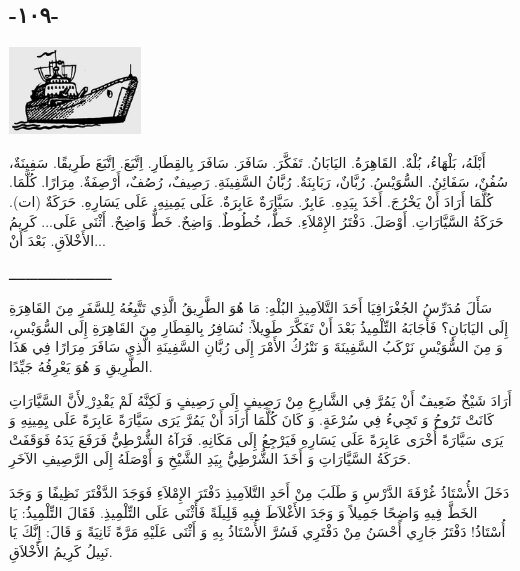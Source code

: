 \documentclass[a5paper]{article}
\begin{document}
\subsection[-١٠٩-]{-١٠٩-}
\begin{center}
\includegraphics[width=1.3752in,height=0.9055in]{images/MuhammadBagauddinprettified-img282.png}
\end{center}
أَبْلَهُ، بَلْهَاءُ، بُلْهٌ. القَاهِرَةُ. اليَابَانُ. تَفَكَّرَ. سَافَرَ. سَافَرَ بِالقِطَارِ. اِتَّبَعَ. اِتَّبَعَ طَرِيقًا. سَفِينَةٌ، سُفُنٌ، سَفَائِنُ. السُّوَيْسُ. رُبَّانٌ، رَبَابِنَةٌ. رُبَّانُ السَّفِينَةِ. رَصِيفٌ، رُصُفٌ، أَرْصِفَةٌ. مِرَارًا. كُلَّمَا. كُلَّمَا أَرَادَ أَنْ يَخْرُجَ. أَخَذَ بِيَدِهِ. عَابِرٌ. سَيَّارَةٌ عَابِرَةٌ. عَلَى يَمِينِهِ. عَلَى يَسَارِهِ. حَرَكَةٌ (ات). حَرَكَةُ السَّيَّارَاتِ. أَوْصَلَ. دَفْتَرُ الإِمْلاَءِ. خَطٌّ، خُطُوطٌ. وَاضِحٌ. خَطٌّ وَاضِحٌ. أَثْنَى عَلَى... كَرِيمُ الأَخْلاَقِ. بَعْدَ أَنْ...

ـــــــــــــــــــــــــ

سَأَلَ مُدَرِّسُ الجُغْرَافِيَا أَحَدَ التَّلاَمِيذِ البُلْهِ: مَا هُوَ الطَّرِيقُ الَّذِي تَتَّبِعُهُ لِلسَّفَرِ مِنَ القَاهِرَةِ إِلَى اليَابَانِ؟ فَأَجَابَهُ التِّلْمِيذُ بَعْدَ أَنْ تَفَكَّرَ طَوِيلاً: نُسَافِرُ بِالقِطَارِ مِنَ القَاهِرَةِ إِلَى السُّوَيْسِ، وَ مِنَ السُّوَيْسِ نَرْكَبُ السَّفِينَةَ وَ نَتْرُكُ الأَمْرَ إِلَى رُبَّانِ السَّفِينَةِ الَّذِي سَافَرَ مِرَارًا فِي هَذَا الطَّرِيقِ وَ هُوَ يَعْرِفُهُ جَيِّدًا.

أَرَادَ شَيْخٌ ضَعِيفٌ أَنْ يَمُرَّ فِي الشَّارِعِ مِنْ رَصِيفٍ إِلَى رَصِيفٍ وَ لَكِنَّهُ لَمْ يَقْدِرْ ِلأَنَّ السَّيَّارَاتِ كَانَتْ تَرُوحُ وَ تَجِيءُ فِي سُرْعَةٍ. وَ كَانَ كُلَّمَا أَرَادَ أَنْ يَمُرَّ يَرَى سَيَّارَةً عَابِرَةً عَلَى يِمِينِهِ وَ يَرَى سَيَّارَةً أُخْرَى عَابِرَةً عَلَى يَسَارِهِ فَيَرْجِعُ إِلَى مَكَانِهِ. فَرَآهُ الشُّرْطِيُّ فَرَفَعَ يَدَهُ فَوَقَفَتْ حَرَكَةُ السَّيَّارَاتِ وَ أَخَذَ الشُّرْطِيُّ بِيَدِ الشَّيْخِ وَ أَوْصَلَهُ إِلَى الرَّصِيفِ الآخَرِ.

دَخَلَ الأُسْتَاذُ غُرْفَةَ الدَّرْسِ وَ طَلَبَ مِنْ أَحَدِ التَّلاَمِيذِ دَفْتَرَ الإِمْلاَءِ فَوَجَدَ الدَّفْتَرَ نَظِيفًا وَ وَجَدَ الخَطَّ فِيهِ وَاضِحًا جَمِيلاً وَ وَجَدَ الأَغْلاَطَ فِيهِ قَلِيلَةً فَأَثْنَى عَلَى التِّلْمِيذِ. فَقَالَ التِّلْمِيذُ: يَا أُسْتَاذُ! دَفْتَرُ جَارِي أَحْسَنُ مِنْ دَفْتَرِي فَسُرَّ الأُسْتَاذُ بِهِ وَ أَثْنَى عَلَيْهِ مَرَّةً ثَانِيَةً وَ قَالَ: إِنَّكَ يَا نَبِيلُ كَرِيمُ الأَخْلاَقِ.
\end{document}
